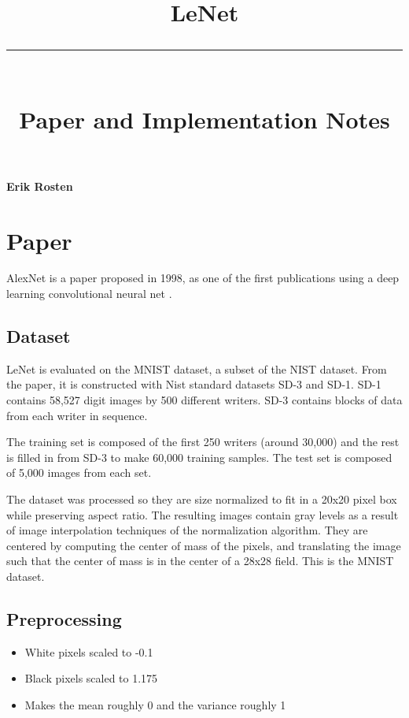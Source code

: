 \documentclass[11pt]{article}
\title{ \huge{LeNet %
		\\ \textcolor{mygray}{\noindent\rule{12cm}{0.4pt}}
		 \\ Paper and Implementation Notes%
		}}
\theoremstyle{definition}
\begin{document}
\maketitle %

\vfill


\vspace{5mm}

\textbf{Erik Rosten}

\newpage


\section{Paper}

AlexNet is a paper proposed in 1998, as one of the first publications using a deep learning convolutional neural net \cite{LeNet}.

\subsection{Dataset}
LeNet is evaluated on the MNIST dataset, a subset of the NIST dataset. From the paper, it is constructed with Nist standard datasets SD-3 and SD-1. SD-1 contains 58,527 digit images by 500 different writers. SD-3 contains blocks of data from each writer in sequence. 

\bigskip

The training set is composed of the first 250 writers (around 30,000) and the rest is filled in from SD-3 to make 60,000 training samples. The test set is composed of 5,000 images from each set. 

\bigskip

The dataset was processed so they are size normalized to fit in a 20x20 pixel box while preserving aspect ratio. The resulting images contain gray levels as a result of image interpolation techniques of the normalization algorithm. They are centered by computing the center of mass of the pixels, and translating the image such that the center of mass is in the center of a 28x28 field. This is the MNIST dataset. 

\subsection{Preprocessing}

\begin{itemize}
\item White pixels scaled to -0.1
\item Black pixels scaled to 1.175
\item Makes the mean roughly 0 and the variance roughly 1
\end{itemize}
\end{document}
